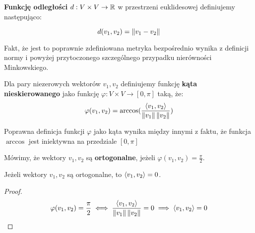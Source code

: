 \begin{definition}
	\textbf{Funkcję odległości} \(d: V \times V \rightarrow \mathbb{R} \) w przestrzeni euklidesowej definiujemy następująco:

	\[
		d(v_1, v_2) = \left\Vert v_1 - v_2 \right\Vert
	\]

	Fakt, że jest to poprawnie zdefiniowana metryka bezpośrednio wynika z definicji normy i powyżej przytoczonego szczególnego przypadku nierówności Minkowskiego.
\end{definition}

\begin{definition}
	Dla pary niezerowych wektorów \(v_1, v_2\) definiujemy funkcję \textbf{kąta nieskierowanego} jako funkcję \(\varphi: V \times V \rightarrow [0, \pi]\) taką, że:
	\[
		\varphi(v_1, v_2) = \arccos(\frac{\langle v_1, v_2 \rangle}{\left\Vert v_1 \right\Vert\left\Vert v_2 \right\Vert})
	\]

	Poprawna definicja funkcji \(\varphi\) jako kąta wynika między innymi z faktu, że funkcja \(\arccos\) jest iniektywna na przedziale \([0, \pi]\)
\end{definition}

\begin{definition}[Ortogonalność]
	Mówimy, że wektory \(v_1, v_2\) są \textbf{ortogonalne}, jeżeli \(\varphi(v_1, v_2) = \frac{\pi}{2}\).
\end{definition}
\begin{fact}
	Jeżeli wektory \(v_1, v_2\) są ortogonalne, to \( \langle v_1, v_2 \rangle = 0\).
\end{fact}
\begin{proof}
	\[
		\varphi(v_1, v_2) = \frac{\pi}{2} \iff \frac{\langle v_1, v_2 \rangle}{\left\Vert v_1 \right\Vert\left\Vert v_2 \right\Vert} = 0 \implies \langle v_1, v_2 \rangle = 0
	\]
\end{proof}

